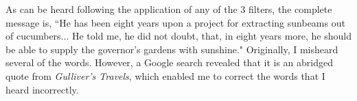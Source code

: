 As can be heard following the application of any of the 3 filters, the complete message is, ``He has been eight years upon a project for extracting sunbeams out of cucumbers... He told me, he did not doubt, that, in eight years more, he should be able to supply the governor’s gardens with sunshine."  Originally, I misheard several of the words.  However, a Google search revealed that it is an abridged quote from \textit{Gulliver's Travels}, which enabled me to correct the words that I heard incorrectly.
